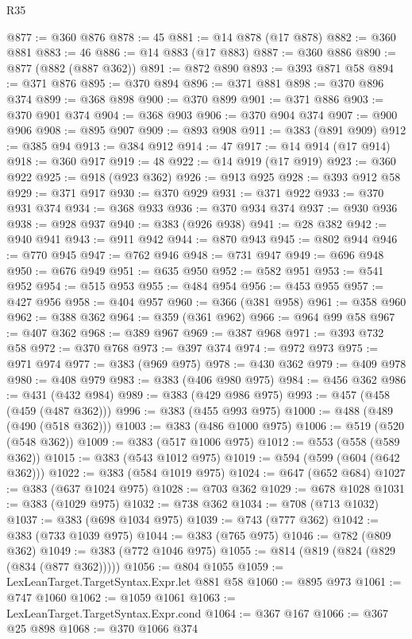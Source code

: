 \begin{lexlean}{R35}
\begin{coremodule}
{{{{{{{{{{{{{{{{{{{{{{{{{{{{{{{{{{{{{{{{{{{{{{{{{{{{@877 := @360 @876
@878 := 45
@881 := @14 @878 (@17 @878)
@882 := @360 @881
@883 := 46
@886 := @14 @883 (@17 @883)
@887 := @360 @886
@890 := @877 (@882 (@887 @362))
@891 := @872 @890
@893 := @393 @871 @58
@894 := @371 @876
@895 := @370 @894
@896 := @371 @881
@898 := @370 @896 @374
@899 := @368 @898
@900 := @370 @899
@901 := @371 @886
@903 := @370 @901 @374
@904 := @368 @903
@906 := @370 @904 @374
@907 := @900 @906
@908 := @895 @907
@909 := @893 @908
@911 := @383 (@891 @909)
@912 := @385 @94
@913 := @384 @912
@914 := 47
@917 := @14 @914 (@17 @914)
@918 := @360 @917
@919 := 48
@922 := @14 @919 (@17 @919)
@923 := @360 @922
@925 := @918 (@923 @362)
@926 := @913 @925
@928 := @393 @912 @58
@929 := @371 @917
@930 := @370 @929
@931 := @371 @922
@933 := @370 @931 @374
@934 := @368 @933
@936 := @370 @934 @374
@937 := @930 @936
@938 := @928 @937
@940 := @383 (@926 @938)
@941 := @28 @382
@942 := @940 @941
@943 := @911 @942
@944 := @870 @943
@945 := @802 @944
@946 := @770 @945
@947 := @762 @946
@948 := @731 @947
@949 := @696 @948
@950 := @676 @949
@951 := @635 @950
@952 := @582 @951
@953 := @541 @952
@954 := @515 @953
@955 := @484 @954
@956 := @453 @955
@957 := @427 @956
@958 := @404 @957
@960 := @366 (@381 @958)
@961 := @358 @960
@962 := @388 @362
@964 := @359 (@361 @962)
@966 := @964 @99 @58
@967 := @407 @362
@968 := @389 @967
@969 := @387 @968
@971 := @393 @732 @58
@972 := @370 @768
@973 := @397 @374
@974 := @972 @973
@975 := @971 @974
@977 := @383 (@969 @975)
@978 := @430 @362
@979 := @409 @978
@980 := @408 @979
@983 := @383 (@406 @980 @975)
@984 := @456 @362
@986 := @431 (@432 @984)
@989 := @383 (@429 @986 @975)
@993 := @457 (@458 (@459 (@487 @362)))
@996 := @383 (@455 @993 @975)
@1000 := @488 (@489 (@490 (@518 @362)))
@1003 := @383 (@486 @1000 @975)
@1006 := @519 (@520 (@548 @362))
@1009 := @383 (@517 @1006 @975)
@1012 := @553 (@558 (@589 @362))
@1015 := @383 (@543 @1012 @975)
@1019 := @594 (@599 (@604 (@642 @362)))
@1022 := @383 (@584 @1019 @975)
@1024 := @647 (@652 @684)
@1027 := @383 (@637 @1024 @975)
@1028 := @703 @362
@1029 := @678 @1028
@1031 := @383 (@1029 @975)
@1032 := @738 @362
@1034 := @708 (@713 @1032)
@1037 := @383 (@698 @1034 @975)
@1039 := @743 (@777 @362)
@1042 := @383 (@733 @1039 @975)
@1044 := @383 (@765 @975)
@1046 := @782 (@809 @362)
@1049 := @383 (@772 @1046 @975)
@1055 := @814 (@819 (@824 (@829 (@834 (@877 @362)))))
@1056 := @804 @1055
@1059 := LexLeanTarget.TargetSyntax.Expr.let @881 @58
@1060 := @895 @973
@1061 := @747 @1060
@1062 := @1059 @1061
@1063 := LexLeanTarget.TargetSyntax.Expr.cond
@1064 := @367 @167
@1066 := @367 @25 @898
@1068 := @370 @1066 @374
}}}}}}}}}}}}}}}}}}}}}}}}}}}}}}}}}}}}}}}}}}}}}}}}}}}}
\end{coremodule}
\end{lexlean}
